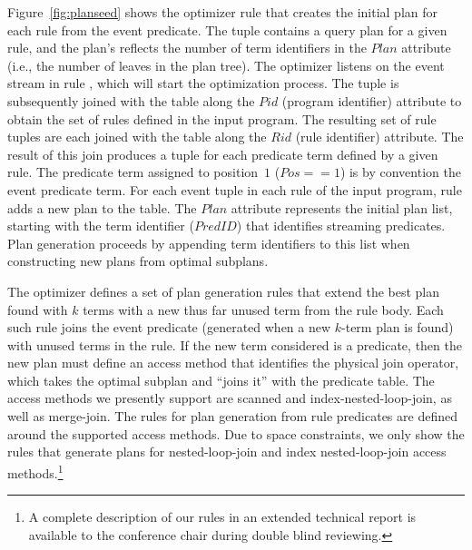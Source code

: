 Figure~\ref{fig:planseed} shows the optimizer rule  that creates
the initial plan for each rule from the event predicate. The  tuple
contains a query plan for a given rule, and the plan's  reflects the number of
term identifiers in the $Plan$ attribute (i.e., the number of leaves in the plan tree). The optimizer listens on the  event stream in
rule , which will start the optimization process.  
The  tuple is subsequently joined with the  table along the 
$Pid$ (program identifier) attribute to obtain the set of rules defined in the input program. 
The resulting set of rule tuples are each joined with the  table along the 
$Rid$ (rule identifier) attribute. The result of this join produces a tuple for each predicate term 
defined by a given rule. The predicate term assigned to position~$1$ ($Pos == 1$) is
by convention the event predicate term.  For each 
event  tuple in each rule of the input program, rule  adds a new 
plan to the  table. The $Plan$ attribute represents the initial plan list,
starting with the term identifier ($PredID$) that identifies streaming predicates.
Plan generation proceeds by appending term identifiers to this list when
constructing new plans from optimal subplans.

The optimizer defines a set of plan generation rules that extend the
best plan found with $k$ terms with a new thus far unused term from the
rule body. Each such rule joins the  event predicate
(generated when a new $k$-term plan is found) with unused terms in the
rule. If the new term considered is a predicate, then the new plan
must define an access method
that identifies the physical join operator, which
takes the optimal subplan and ``joins it'' with the predicate table. The access methods we presently 
support are scanned and index-nested-loop-join, as well as merge-join. 
The rules for plan generation from rule predicates are defined around the supported access methods. 
Due to space constraints, we only show the rules that generate plans for nested-loop-join 
and index nested-loop-join access methods.\footnote{A complete description of our rules 
in an extended technical report is available to the conference chair
during double blind reviewing.}

